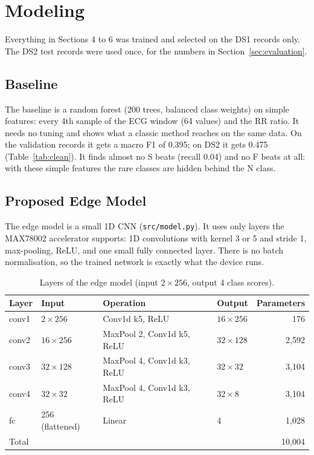 \documentclass[11pt,a4paper]{article}
\newcommand{\code}[1]{\texttt{#1}}
\begin{document}
\section{Modeling}

Everything in Sections 4 to 6 was trained and selected on the DS1 records only. The DS2 test records were used once, for the numbers in Section~\ref{sec:evaluation}.

\subsection{Baseline}

The baseline is a random forest (200 trees, balanced class weights) on simple features: every 4th sample of the ECG window (64 values) and the RR ratio. It needs no tuning and shows what a classic method reaches on the same data. On the validation records it gets a macro F1 of 0.395; on DS2 it gets 0.475 (Table~\ref{tab:clean}). It finds almost no S beats (recall 0.04) and no F beats at all: with these simple features the rare classes are hidden behind the N class.

\subsection{Proposed Edge Model}
\label{sec:model}

The edge model is a small 1D CNN (\code{src/model.py}). It uses only layers the MAX78002 accelerator supports: 1D convolutions with kernel 3 or 5 and stride 1, max-pooling, ReLU, and one small fully connected layer. There is no batch normalisation, so the trained network is exactly what the device runs.

\begin{table}[H]
\centering
\small
\caption{Layers of the edge model (input $2 \times 256$, output 4 class scores).}
\label{tab:arch}
\begin{tabular}{@{} l l l l r @{}}
\toprule
Layer & Input & Operation & Output & Parameters \\
\midrule
conv1 & $2 \times 256$ & Conv1d k5, ReLU & $16 \times 256$ & 176 \\
conv2 & $16 \times 256$ & MaxPool 2, Conv1d k5, ReLU & $32 \times 128$ & 2,592 \\
conv3 & $32 \times 128$ & MaxPool 4, Conv1d k3, ReLU & $32 \times 32$ & 3,104 \\
conv4 & $32 \times 32$ & MaxPool 4, Conv1d k3, ReLU & $32 \times 8$ & 3,104 \\
fc & 256 (flattened) & Linear & 4 & 1,028 \\
\midrule
Total & & & & 10,004 \\
\bottomrule
\end{tabular}
\end{table}
\end{document}
